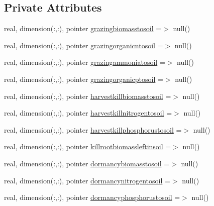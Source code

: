 \subsection*{Private Attributes}
\begin{DoxyCompactItemize}
\item 
real, dimension(\+:,\+:), pointer \mbox{\hyperlink{structmodulevegetation_1_1t__fluxestosoil_ae5fef44fd4e965f9426a8fcd6183247f}{grazingbiomasstosoil}} =$>$ null()
\item 
real, dimension(\+:,\+:), pointer \mbox{\hyperlink{structmodulevegetation_1_1t__fluxestosoil_a7baf3b527aacb2624c05ed329cf17f13}{grazingorganicntosoil}} =$>$ null()
\item 
real, dimension(\+:,\+:), pointer \mbox{\hyperlink{structmodulevegetation_1_1t__fluxestosoil_adf6934c51e5dfadd34d507122731d6ce}{grazingammoniatosoil}} =$>$ null()
\item 
real, dimension(\+:,\+:), pointer \mbox{\hyperlink{structmodulevegetation_1_1t__fluxestosoil_aa6946abb05230446f9ea85a3cbbe5afe}{grazingorganicptosoil}} =$>$ null()
\item 
real, dimension(\+:,\+:), pointer \mbox{\hyperlink{structmodulevegetation_1_1t__fluxestosoil_a95813c228fbb2a3facde6a966f2b8e5a}{harvestkillbiomasstosoil}} =$>$ null()
\item 
real, dimension(\+:,\+:), pointer \mbox{\hyperlink{structmodulevegetation_1_1t__fluxestosoil_af6f030609b79dbd893344a84f974cceb}{harvestkillnitrogentosoil}} =$>$ null()
\item 
real, dimension(\+:,\+:), pointer \mbox{\hyperlink{structmodulevegetation_1_1t__fluxestosoil_a20a86f1c36381bba0f71afee95949936}{harvestkillphosphorustosoil}} =$>$ null()
\item 
real, dimension(\+:,\+:), pointer \mbox{\hyperlink{structmodulevegetation_1_1t__fluxestosoil_a8346281ab884a509c885b3054f35caf6}{killrootbiomassleftinsoil}} =$>$ null()
\item 
real, dimension(\+:,\+:), pointer \mbox{\hyperlink{structmodulevegetation_1_1t__fluxestosoil_a94a5975a85ac4df63ef8a0b17a168c01}{dormancybiomasstosoil}} =$>$ null()
\item 
real, dimension(\+:,\+:), pointer \mbox{\hyperlink{structmodulevegetation_1_1t__fluxestosoil_aaf54ae816f7e4820016b3359d06919eb}{dormancynitrogentosoil}} =$>$ null()
\item 
real, dimension(\+:,\+:), pointer \mbox{\hyperlink{structmodulevegetation_1_1t__fluxestosoil_a0f9863207e868d04fe134934d4d0e319}{dormancyphosphorustosoil}} =$>$ null()

\end{DoxyCompactItemize}

